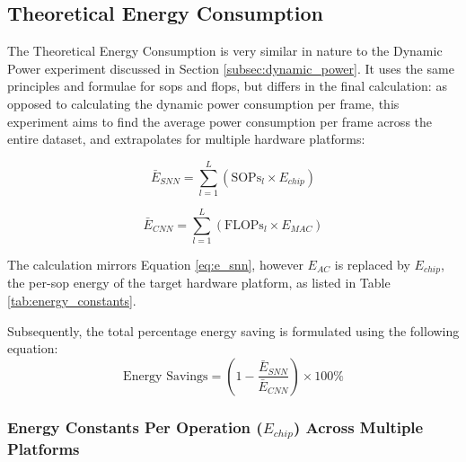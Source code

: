 \subsection{Theoretical Energy Consumption}
\label{subsec:energy_consumption}

The Theoretical Energy Consumption is very similar in nature to the Dynamic Power experiment discussed in Section \ref{subsec:dynamic_power}.
It uses the same principles and formulae for \glspl{sop} and \glspl{flop},
but differs in the final calculation:
as opposed to calculating the dynamic power consumption per frame, this experiment aims to find the average power consumption per frame across the entire dataset, and extrapolates for multiple hardware platforms:

\begin{equation}
\bar{E}_{SNN} = \sum_{l=1}^{L} (\mathrm{SOPs}_l \times E_{chip})
\end{equation}

\begin{equation}
    \bar{E}_{CNN} = \sum_{l=1}^{L} (\mathrm{FLOPs}_l \times E_{MAC})
\end{equation}

\noindent The calculation mirrors Equation \ref{eq:e_snn}, however $E_{AC}$ is replaced by $E_{chip}$, the per-\gls{sop} energy of the target hardware platform, as listed in Table \ref{tab:energy_constants}.

Subsequently, the total percentage energy saving is formulated using the following equation:
\begin{equation}
    \text{Energy Savings} = \left(1 - \frac{\bar{E}_{SNN}}{\bar{E}_{CNN}} \right) \times 100\%
\end{equation}

\subsubsection{Energy Constants Per Operation ($E_{chip}$) Across Multiple Platforms}

\begin{table}[htbp]
\centering
{}
\caption{Energy constants per operation ($E_{chip}$) for each architecture and platform.}
\label{tab:energy_constants}
\end{table}

